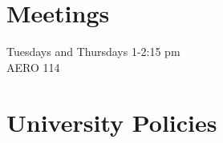 \documentclass[9pt]{article}
\begin{document}
\section*{Meetings}

Tuesdays and Thursdays 1-2:15 pm\\
AERO 114

\section*{University Policies}


\end{document}
